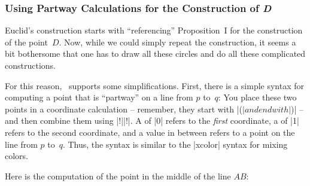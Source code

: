 \begin{paracol}{2}


\subsubsection{Using Partway Calculations for the Construction of \emph{D}}

Euclid's construction starts with ``referencing'' Proposition~I for the
construction of the point~$D$. Now, while we could simply repeat the
construction, it seems a bit bothersome that one has to draw all these circles
and do all these complicated constructions.

For this reason, \tikzname\ supports some simplifications. First, there is a
simple syntax for computing a point that is ``partway'' on a line from $p$
to~$q$: You place these two points in a coordinate calculation -- remember,
they start with |($| and end with |$)| -- and then combine them using
|!||!|. A  of |0| refers to the \emph{first} coordinate,
a  of |1| refers to the second coordinate, and a value in between
refers to a point on the line from $p$ to~$q$. Thus, the syntax is similar to
the |xcolor| syntax for mixing colors.

Here is the computation of the point in the middle of the line $AB$:
%
\begin{codeexample}[preamble={\usetikzlibrary{calc}}]
\end{codeexample}


\end{paracol}
